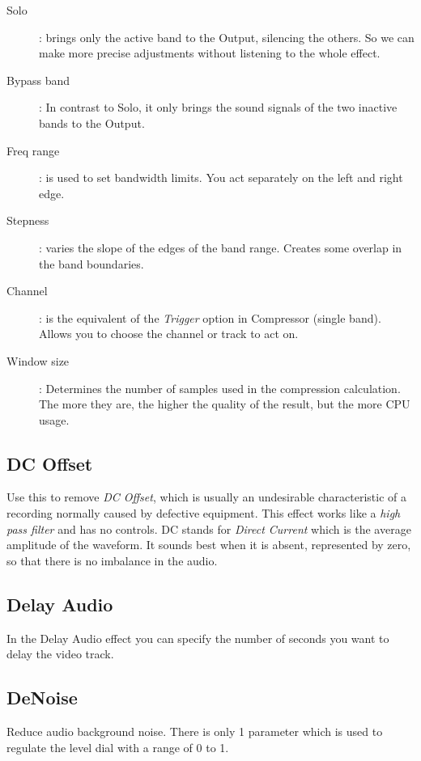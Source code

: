 \begin{description}
	\item[Solo]: brings only the active band to the Output, silencing the others. So we can make more precise adjustments without listening to the whole effect.
	\item[Bypass band]: In contrast to Solo, it only brings the sound signals of the two inactive bands to the Output.
	\item[Freq range]: is used to set bandwidth limits. You act separately on the left and right edge.
	\item[Stepness]: varies the slope of the edges of the band range. Creates some overlap in the band boundaries.
	\item[Channel]: is the equivalent of the \textit{Trigger} option in Compressor (single band). Allows you to choose the channel or track to act on.
	\item[Window size]: Determines the number of samples used in the compression calculation. The more they are, the higher the quality of the result, but the more CPU usage.
\end{description}

\subsection{DC Offset}%
\label{sub:dc_offset}

Use this to remove \textit{DC Offset}, which is usually an undesirable characteristic of a recording normally caused by defective equipment. This effect works like a \textit{high pass filter} and has no controls. DC stands for \textit{Direct Current} which is the average amplitude of the waveform. It sounds best when it is absent, represented by zero, so that there is no imbalance in the audio.

\subsection{Delay Audio}%
\label{sub:delay_audio}

In the Delay Audio effect you can specify the number of seconds you want to delay the video track.

\subsection{DeNoise}%
\label{sub:denoise}

Reduce audio background noise. There is only 1 parameter which is used to regulate the level dial with a range of 0 to 1.

